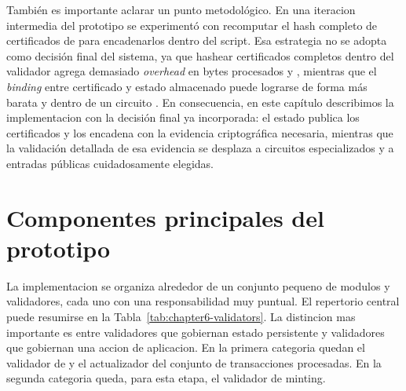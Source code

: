 También es importante aclarar un punto metodológico. En una iteracion intermedia del prototipo se experimentó con recomputar \Onchain el hash completo de certificados de \Mithril para encadenarlos dentro del script. Esa estrategia no se adopta como decisión final del sistema, ya que hashear certificados completos dentro del validador agrega demasiado \textit{overhead} en bytes procesados y \ExUnits, mientras que el \textit{binding} entre certificado y estado almacenado \Onchain puede lograrse de forma más barata y dentro de un circuito \Offchain. En consecuencia, en este capítulo describimos la implementacion con la decisión final ya incorporada: el estado \Onchain publica los certificados y los encadena con la evidencia criptográfica necesaria, mientras que la validación detallada de esa evidencia se desplaza a circuitos especializados y a entradas públicas cuidadosamente elegidas.

\section{Componentes principales del prototipo}

La implementacion se organiza alrededor de un conjunto pequeno de modulos y validadores, cada uno con una responsabilidad muy puntual. El repertorio central puede resumirse en la Tabla~\ref{tab:chapter6-validators}. La distincion mas importante es entre validadores que gobiernan estado persistente y validadores que gobiernan una accion de aplicacion. En la primera categoria quedan el validador de \StakeDistribution y el actualizador del conjunto de transacciones procesadas. En la segunda categoria queda, para esta etapa, el validador de minting.

